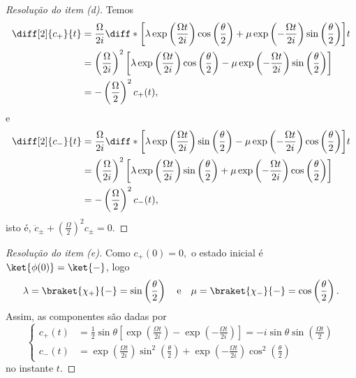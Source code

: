 \begin{proof}[Resolução do item (d)]
    Temos
    \begin{align*}
        \diff[2]{c_+}{t} &= \frac{\Omega}{2i}\diff*{\left[\lambda \exp\left(\frac{\Omega t}{2i}\right)\cos\left(\frac\theta2\right) + \mu\exp\left(-\frac{\Omega t}{2i}\right)\sin\left(\frac\theta2\right)\right]}{t}\\
                         &= \left(\frac{\Omega}{2i}\right)^2\left[\lambda \exp\left(\frac{\Omega t}{2i}\right)\cos\left(\frac\theta2\right) - \mu\exp\left(-\frac{\Omega t}{2i}\right)\sin\left(\frac\theta2\right)\right]\\
                         &= -\left(\frac{\Omega}{2}\right)^2 c_+(t),
    \end{align*}
    e
    \begin{align*}
        \diff[2]{c_-}{t} &= \frac{\Omega}{2i}\diff*{\left[\lambda\exp\left(\frac{\Omega t}{2i}\right)\sin\left(\frac\theta2\right) - \mu\exp\left(-\frac{\Omega t}{2i}\right)\cos\left(\frac\theta2\right)\right]}{t}\\
                         &= \left(\frac{\Omega}{2i}\right)^2\left[\lambda\exp\left(\frac{\Omega t}{2i}\right)\sin\left(\frac\theta2\right) + \mu\exp\left(-\frac{\Omega t}{2i}\right)\cos\left(\frac\theta2\right)\right]\\
                         &= -\left(\frac{\Omega}{2}\right)^2 c_-(t),
    \end{align*}
    isto é, \(\ddot{c}_{\pm} + \left(\frac{\Omega}{2}\right)^2 c_{\pm} = 0\).
\end{proof}
\begin{proof}[Resolução do item (e)]
    Como \(c_+(0) = 0,\) o estado inicial é \(\ket{\phi(0)} = \ket{-}\), logo
    \begin{equation*}
        \lambda = \braket{\chi_+}{-} = \sin\left(\frac\theta2\right)
        \quad\text{e}\quad
        \mu = \braket{\chi_-}{-} = \cos\left(\frac\theta2\right).
    \end{equation*}
    Assim, as componentes são dadas por
    \begin{equation*}
        \left\{
        \begin{aligned}
            c_+(t) &= \frac12\sin{\theta}\left[\exp\left(\frac{\Omega t}{2i}\right) - \exp\left(-\frac{\Omega t}{2i}\right)\right] = -i \sin{\theta}\sin\left(\frac{\Omega t}{2}\right)\\
            c_-(t) &= \exp\left(\frac{\Omega t}{2i}\right)\sin^2\left(\frac\theta2\right) + \exp\left(-\frac{\Omega t}{2i}\right)\cos^2\left(\frac\theta2\right)
        \end{aligned}\right.
    \end{equation*}
    no instante \(t\).
\end{proof}
